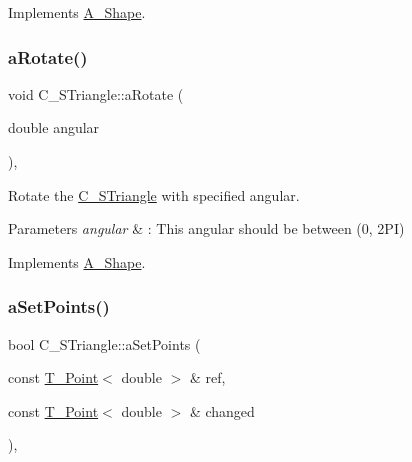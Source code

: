 Implements \hyperlink{classA__Shape_a892688cbbad3297e00e87cce0dbfc76d}{A\+\_\+\+Shape}.

\mbox{\label{classC__STriangle_a52612242aba17043862355c030637a18}} 
\subsubsection{\texorpdfstring{a\+Rotate()}{aRotate()}}
{\footnotesize\ttfamily void C\+\_\+\+S\+Triangle\+::a\+Rotate (\begin{DoxyParamCaption}\item[{double}]{angular }\end{DoxyParamCaption})\hspace{0.3cm}{\ttfamily [override]}, {\ttfamily [virtual]}}



Rotate the \hyperlink{classC__STriangle}{C\+\_\+\+S\+Triangle} with specified angular. 


\begin{DoxyParams}{Parameters}
{\em angular} & \+: This angular should be between (0, 2\+PI) \\
\hline
\end{DoxyParams}


Implements \hyperlink{classA__Shape_a25b4e0c34cdb46da5382fe9c7467efaf}{A\+\_\+\+Shape}.

\mbox{\label{classC__STriangle_a431802d5e10b69f535e7929a23963b5e}} 
\subsubsection{\texorpdfstring{a\+Set\+Points()}{aSetPoints()}}
{\footnotesize\ttfamily bool C\+\_\+\+S\+Triangle\+::a\+Set\+Points (\begin{DoxyParamCaption}\item[{const \hyperlink{classT__Point}{T\+\_\+\+Point}$<$ double $>$ \&}]{ref,  }\item[{const \hyperlink{classT__Point}{T\+\_\+\+Point}$<$ double $>$ \&}]{changed }\end{DoxyParamCaption})\hspace{0.3cm}{\ttfamily [override]}, {\ttfamily [virtual]}}



